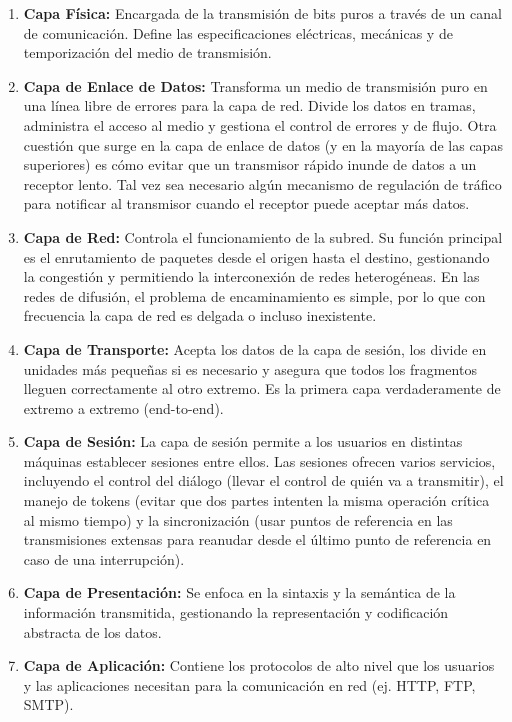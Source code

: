 \begin{enumerate}
  \item \textbf{Capa Física:} Encargada de la transmisión de bits puros a través de un canal de comunicación. Define las especificaciones eléctricas, mecánicas y de temporización del medio de transmisión.
  \item \textbf{Capa de Enlace de Datos:} Transforma un medio de transmisión puro en una línea libre de errores para la capa de red. Divide los datos en tramas, administra el acceso al medio y gestiona el control de errores y de flujo. Otra cuestión que surge en la capa de enlace de datos (y en la mayoría de las capas superiores) es cómo evitar que un transmisor rápido inunde de datos a un receptor lento. Tal vez sea necesario algún mecanismo de regulación de tráfico para notificar al transmisor cuando el receptor puede aceptar más datos.
  \item \textbf{Capa de Red:} Controla el funcionamiento de la subred. Su función principal es el enrutamiento de paquetes desde el origen hasta el destino, gestionando la congestión y permitiendo la interconexión de redes heterogéneas. En las redes de difusión, el problema de encaminamiento es simple, por lo que con frecuencia la capa de red es delgada o incluso inexistente.
  \item \textbf{Capa de Transporte:} Acepta los datos de la capa de sesión, los divide en unidades más pequeñas si es necesario y asegura que todos los fragmentos lleguen correctamente al otro extremo. Es la primera capa verdaderamente de extremo a extremo (end-to-end).
  \item \textbf{Capa de Sesión:} La capa de sesión permite a los usuarios en distintas máquinas establecer sesiones entre ellos. Las sesiones ofrecen varios servicios, incluyendo el control del diálogo (llevar el control de quién va a transmitir), el manejo de tokens (evitar que dos partes intenten la misma operación crítica al mismo tiempo) y la sincronización (usar puntos de referencia en las transmisiones extensas para reanudar desde el último punto de referencia en caso de una interrupción).
  \item \textbf{Capa de Presentación:} Se enfoca en la sintaxis y la semántica de la información transmitida, gestionando la representación y codificación abstracta de los datos.
  \item \textbf{Capa de Aplicación:} Contiene los protocolos de alto nivel que los usuarios y las aplicaciones necesitan para la comunicación en red (ej. HTTP, FTP, SMTP).
\end{enumerate}

